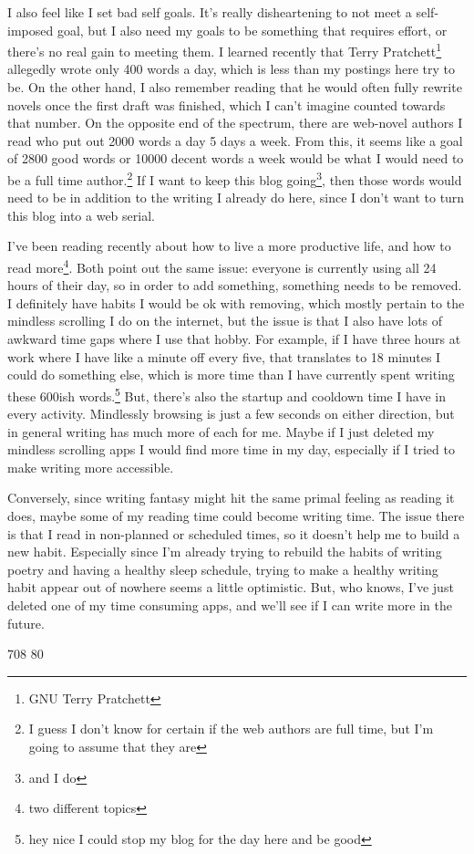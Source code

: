 \documentclass[12pt]{article}[titlepage]
\newcommand{\1}{\={a}}
\newcommand{\2}{\={e}}
\newcommand{\3}{\={\i}}
\newcommand{\4}{\=o}
\newcommand{\5}{\=u}
\newcommand{\6}{\={A}}
\renewcommand{\,}{\textsuperscript{,}}
\begin{document}
I also feel like I set bad self goals.
It's really disheartening to not meet a self-imposed goal, but I also need my goals to be something that requires effort, or there's no real gain to meeting them.
I learned recently that Terry Pratchett\footnote{GNU Terry Pratchett} allegedly wrote only 400 words a day, which is less than my postings here try to be.
On the other hand, I also remember reading that he would often fully rewrite novels once the first draft was finished, which I can't imagine counted towards that number.
On the opposite end of the spectrum, there are web-novel authors I read who put out 2000 words a day 5 days a week.
From this, it seems like a goal of 2800 good words or 10000 decent words a week would be what I would need to be a full time author.\footnote{I guess I don't know for certain if the web authors are full time, but I'm going to assume that they are}
If I want to keep this blog going\footnote{and I do}, then those words would need to be in addition to the writing I already do here, since I don't want to turn this blog into a web serial.

I've been reading recently about how to live a more productive life, and how to read more\footnote{two different topics}. 
Both point out the same issue: everyone is currently using all 24 hours of their day, so in order to add something, something needs to be removed.
I definitely have habits I would be ok with removing, which mostly pertain to the mindless scrolling I do on the internet, but the issue is that I also have lots of awkward time gaps where I use that hobby.
For example, if I have three hours at work where I have like a minute off every five, that translates to 18 minutes I could do something else, which is more time than I have currently spent writing these 600ish words.\footnote{hey nice I could stop my blog for the day here and be good}
But, there's also the startup and cooldown time I have in every activity.
Mindlessly browsing is just a few seconds on either direction, but in general writing has much more of each for me.
Maybe if I just deleted my mindless scrolling apps I would find more time in my day, especially if I tried to make writing more accessible.

Conversely, since writing fantasy might hit the same primal feeling as reading it does, maybe some of my reading time could become writing time.
The issue there is that I read in non-planned or scheduled times, so it doesn't help me to build a new habit.
Especially since I'm already trying to rebuild the habits of writing poetry and having a healthy sleep schedule, trying to make a healthy writing habit appear out of nowhere seems a little optimistic.
But, who knows, I've just deleted one of my time consuming apps, and we'll see if I can write more in the future.

708 80
\end{document}
